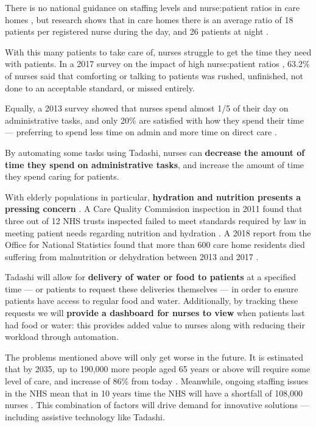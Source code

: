 \documentclass{article}
\begin{document}
There is no national guidance on staffing levels and nurse:patient ratios in care homes \cite{rcnstaffingadvice}, but research shows that in care homes there is an average ratio of 18 patients per registered nurse during the day, and 26 patients at night \cite{rcnstaffingguidance}.

With this many patients to take care of, nurses struggle to get the time they need with patients. In a 2017 survey on the impact of high nurse:patient ratios \cite{unison}, 63.2\% of nurses said that comforting or talking to patients was rushed, unfinished, not done to an acceptable standard, or missed entirely.

Equally, a 2013 survey showed that nurses spend almost 1/5 of their day on administrative tasks, and only 20\% are satisfied with how they spend their time --- preferring to spend less time on admin and more time on direct care \cite{rcnpol}.

By automating some tasks using Tadashi, nurses can {\bf decrease the amount of time they spend on administrative tasks}, and increase the amount of time they spend caring for patients.

With elderly populations in particular, {\bf hydration and nutrition presents a pressing concern} \cite{hydrate}. A Care Quality Commission inspection in 2011 found that three out of 12 NHS trusts inspected failed to meet standards required by law in meeting patient needs regarding nutrition and hydration \cite{cqc}. A 2018 report from the Office for National Statistics found that more than 600 care home residents died suffering from malnutrition or dehydration between 2013 and 2017 \cite{ons}.

Tadashi will allow for {\bf delivery of water or food to patients} at a specified time --- or patients to request these deliveries themselves --- in order to ensure patients have access to regular food and water. Additionally, by tracking these requests we will {\bf provide a dashboard for nurses to view} when patients last had food or water: this provides added value to nurses along with reducing their workload through automation. 

The problems mentioned above will only get worse in the future. It is estimated that by 2035, up to 190,000 more people aged 65 years or above will require some level of care, and increase of 86\% from today \cite{lancet}. Meanwhile, ongoing staffing issues in the NHS mean that in 10 years time the NHS will have a shortfall of 108,000 nurses \cite{nuffield}. This combination of factors will drive demand for innovative solutions --- including assistive technology like Tadashi.
\end{document}
